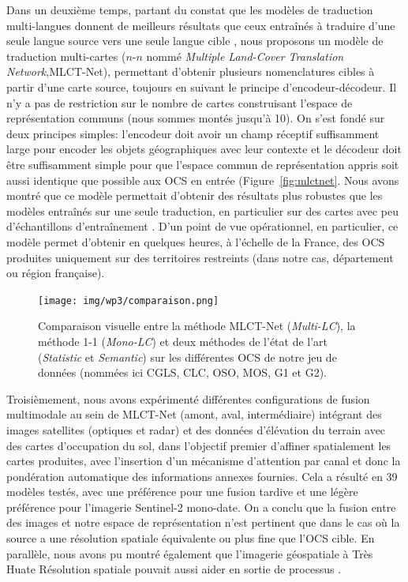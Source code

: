 Dans un deuxième temps, partant du constat que les modèles de traduction multi-langues donnent de meilleurs résultats que ceux entraînés à traduire d'une seule langue source vers une seule langue cible \cite{Pires2019}, nous proposons un modèle de traduction multi-cartes ($n$-$n$ nommé  \emph{Multiple Land-Cover Translation Network},MLCT-Net), permettant d'obtenir plusieurs nomenclatures cibles à partir d'une carte source, toujours en suivant le principe d'encodeur-décodeur. Il n'y a pas de restriction sur le nombre de cartes construisant l'espace de représentation communs (nous sommes montés jusqu'à 10). On s'est fondé sur deux principes simples: l'encodeur doit avoir un champ réceptif suffisamment large pour encoder les objets géographiques avec leur contexte et le décodeur doit être suffisamment simple pour que l'espace commun de représentation appris soit aussi identique que possible aux OCS en entrée (Figure~\ref{fig:mlctnet}.
Nous avons montré que ce modèle permettait d'obtenir des résultats plus robustes que les modèles entraînés sur une seule traduction, en particulier sur des cartes avec peu d'échantillons d'entraînement \cite{Luc_IGARSS22} \cite{luc_ijgis}. D'un point de vue opérationnel, en particulier, ce modèle permet d'obtenir en quelques heures, à l'échelle de la France, des OCS produites uniquement sur des territoires restreints (dans notre cas, département ou région française).\\
  \begin{figure}[htbp]
        \centering
        \texttt{[image: img/wp3/comparaison.png]}
        \caption{Comparaison visuelle entre la méthode MLCT-Net (\emph{Multi-LC}), la méthode 1-1 (\emph{Mono-LC}) et deux méthodes de l'état de l'art (\emph{Statistic} et \emph{Semantic}) sur les différentes OCS de notre jeu de données (nommées ici CGLS, CLC, OSO, MOS, G1 et G2).\label{fig:comparison}}
        \end{figure}
Troisièmement, nous avons expérimenté différentes configurations de fusion multimodale au sein de MLCT-Net (amont, aval, intermédiaire) intégrant des images satellites (optiques et radar) et des données d'élévation du terrain avec des cartes d'occupation du sol, dans l'objectif premier d'affiner spatialement les cartes produites, avec l'insertion d'un mécanisme d'attention par canal et donc la pondération automatique des informations annexes fournies. Cela a résulté en 39 modèles testés, avec une préférence pour une fusion tardive et une légère préférence pour l'imagerie Sentinel-2 mono-date. On a conclu que la fusion entre des images et notre espace de représentation n'est pertinent que dans le cas où la source a une résolution spatiale équivalente ou plus fine que l'OCS cible. En parallèle, nous avons pu montré également que l'imagerie géospatiale à Très Huate Résolution spatiale pouvait aussi aider en sortie de processus \cite{Stocker_ISPRS20}.\\

